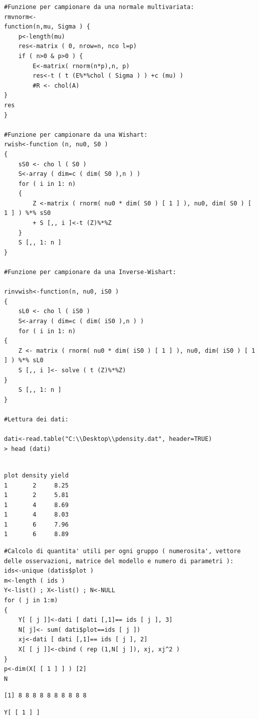 \begin{lstlisting}[style=R]
#Funzione per campionare da una normale multivariata:
rmvnorm<-
function(n,mu, Sigma ) {
    p<-length(mu)
    res<-matrix ( 0, nrow=n, nco l=p)
    if ( n>0 & p>0 ) {
        E<-matrix( rnorm(n*p),n, p)
        res<-t ( t (E%*%chol ( Sigma ) ) +c (mu) )
        #R <- chol(A)
}
res
}

#Funzione per campionare da una Wishart:
rwish<-function (n, nu0, S0 )
{
    sS0 <- cho l ( S0 )
    S<-array ( dim=c ( dim( S0 ),n ) )
    for ( i in 1: n)
    {
        Z <-matrix ( rnorm( nu0 * dim( S0 ) [ 1 ] ), nu0, dim( S0 ) [ 1 ] ) %*% sS0
        + S [,, i ]<-t (Z)%*%Z
    }
    S [,, 1: n ]
}

#Funzione per campionare da una Inverse-Wishart:

rinvwish<-function(n, nu0, iS0 )
{
    sL0 <- cho l ( iS0 )
    S<-array ( dim=c ( dim( iS0 ),n ) )
    for ( i in 1: n)
{
    Z <- matrix ( rnorm( nu0 * dim( iS0 ) [ 1 ] ), nu0, dim( iS0 ) [ 1 ] ) %*% sL0
    S [,, i ]<- solve ( t (Z)%*%Z)
}
    S [,, 1: n ]
}

#Lettura dei dati:

dati<-read.table("C:\\Desktop\\pdensity.dat", header=TRUE)
> head (dati)


\end{lstlisting}
{
\color{red}
\begin{Verbatim}
plot density yield
1       2     8.25
1       2     5.81
1       4     8.69
1       4     8.03
1       6     7.96
1       6     8.89
\end{Verbatim}
}

\begin{lstlisting}[style=R]
#Calcolo di quantita' utili per ogni gruppo ( numerosita', vettore delle osservazioni, matrice del modello e numero di parametri ):
ids<-unique (datis$plot )
m<-length ( ids )
Y<-list() ; X<-list() ; N<-NULL
for ( j in 1:m)
{
    Y[ [ j ]]<-dati [ dati [,1]== ids [ j ], 3]
    N[ j]<- sum( dati$plot==ids [ j ])
    xj<-dati [ dati [,1]== ids [ j ], 2]
    X[ [ j ]]<-cbind ( rep (1,N[ j ]), xj, xj^2 )
}
p<-dim(X[ [ 1 ] ] ) [2]
N
\end{lstlisting}

{
\color{red}
\begin{verbatim}
[1] 8 8 8 8 8 8 8 8 8 8
\end{verbatim}
}

\begin{lstlisting}[style=R]
Y[ [ 1 ] ]
\end{lstlisting}

